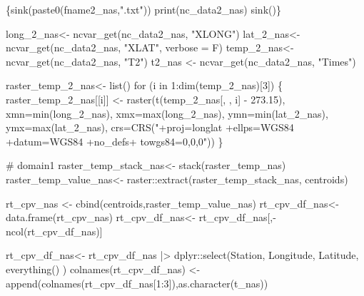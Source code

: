 \documentclass[
  letterpaper,
  DIV=11,
  numbers=noendperiod,
  abstract]{scrartcl}
\newenvironment{Shaded}{\begin{snugshade}}{\end{snugshade}}
\newcommand{\AttributeTok}[1]{\textcolor[rgb]{0.40,0.45,0.13}{#1}}
\newcommand{\CommentTok}[1]{\textcolor[rgb]{0.37,0.37,0.37}{#1}}
\newcommand{\ControlFlowTok}[1]{\textcolor[rgb]{0.00,0.23,0.31}{#1}}
\newcommand{\DecValTok}[1]{\textcolor[rgb]{0.68,0.00,0.00}{#1}}
\newcommand{\FloatTok}[1]{\textcolor[rgb]{0.68,0.00,0.00}{#1}}
\newcommand{\FunctionTok}[1]{\textcolor[rgb]{0.28,0.35,0.67}{#1}}
\newcommand{\NormalTok}[1]{\textcolor[rgb]{0.00,0.23,0.31}{#1}}
\newcommand{\OtherTok}[1]{\textcolor[rgb]{0.00,0.23,0.31}{#1}}
\newcommand{\SpecialCharTok}[1]{\textcolor[rgb]{0.37,0.37,0.37}{#1}}
\newcommand{\StringTok}[1]{\textcolor[rgb]{0.13,0.47,0.30}{#1}}
\begin{document}
\begin{Shaded}
\begin{Highlighting}[]
\NormalTok{\{}\FunctionTok{sink}\NormalTok{(}\FunctionTok{paste0}\NormalTok{(fname2\_nas,}\StringTok{".txt"}\NormalTok{))}
  \FunctionTok{print}\NormalTok{(nc\_data2\_nas)}
  \FunctionTok{sink}\NormalTok{()\}}

\NormalTok{long\_2\_nas}\OtherTok{\textless{}{-}} \FunctionTok{ncvar\_get}\NormalTok{(nc\_data2\_nas, }\StringTok{"XLONG"}\NormalTok{)}
\NormalTok{lat\_2\_nas}\OtherTok{\textless{}{-}} \FunctionTok{ncvar\_get}\NormalTok{(nc\_data2\_nas, }\StringTok{"XLAT"}\NormalTok{, }\AttributeTok{verbose =}\NormalTok{ F)}
\NormalTok{temp\_2\_nas}\OtherTok{\textless{}{-}} \FunctionTok{ncvar\_get}\NormalTok{(nc\_data2\_nas, }\StringTok{"T2"}\NormalTok{) }
\NormalTok{t2\_nas }\OtherTok{\textless{}{-}} \FunctionTok{ncvar\_get}\NormalTok{(nc\_data2\_nas, }\StringTok{"Times"}\NormalTok{)}

\NormalTok{raster\_temp\_2\_nas}\OtherTok{\textless{}{-}} \FunctionTok{list}\NormalTok{()}
\ControlFlowTok{for}\NormalTok{ (i }\ControlFlowTok{in} \DecValTok{1}\SpecialCharTok{:}\FunctionTok{dim}\NormalTok{(temp\_2\_nas)[}\DecValTok{3}\NormalTok{])   \{}
\NormalTok{    raster\_temp\_2\_nas[[i]] }\OtherTok{\textless{}{-}} \FunctionTok{raster}\NormalTok{(}\FunctionTok{t}\NormalTok{(temp\_2\_nas[, , i] }\SpecialCharTok{{-}} \FloatTok{273.15}\NormalTok{), }
       \AttributeTok{xmn=}\FunctionTok{min}\NormalTok{(long\_2\_nas), }\AttributeTok{xmx=}\FunctionTok{max}\NormalTok{(long\_2\_nas),}
       \AttributeTok{ymn=}\FunctionTok{min}\NormalTok{(lat\_2\_nas), }\AttributeTok{ymx=}\FunctionTok{max}\NormalTok{(lat\_2\_nas), }
       \AttributeTok{crs=}\FunctionTok{CRS}\NormalTok{(}\StringTok{"+proj=longlat +ellps=WGS84 +datum=WGS84 +no\_defs+ towgs84=0,0,0"}\NormalTok{))}
\NormalTok{\}}

\CommentTok{\# domain1}
\NormalTok{raster\_temp\_stack\_nas}\OtherTok{\textless{}{-}} \FunctionTok{stack}\NormalTok{(raster\_temp\_nas)}
\NormalTok{raster\_temp\_value\_nas}\OtherTok{\textless{}{-}}\NormalTok{ raster}\SpecialCharTok{::}\FunctionTok{extract}\NormalTok{(raster\_temp\_stack\_nas, centroids)}

\NormalTok{rt\_cpv\_nas }\OtherTok{\textless{}{-}} \FunctionTok{cbind}\NormalTok{(centroids,raster\_temp\_value\_nas)}
\NormalTok{rt\_cpv\_df\_nas}\OtherTok{\textless{}{-}} \FunctionTok{data.frame}\NormalTok{(rt\_cpv\_nas)}
\NormalTok{rt\_cpv\_df\_nas}\OtherTok{\textless{}{-}}\NormalTok{ rt\_cpv\_df\_nas[,}\SpecialCharTok{{-}}\FunctionTok{ncol}\NormalTok{(rt\_cpv\_df\_nas)]}

\NormalTok{rt\_cpv\_df\_nas}\OtherTok{\textless{}{-}} 
\NormalTok{  rt\_cpv\_df\_nas }\SpecialCharTok{|\textgreater{}} 
\NormalTok{  dplyr}\SpecialCharTok{::}\FunctionTok{select}\NormalTok{(Station, Longitude, Latitude,  }\FunctionTok{everything}\NormalTok{() )}
\FunctionTok{colnames}\NormalTok{(rt\_cpv\_df\_nas) }\OtherTok{\textless{}{-}} \FunctionTok{append}\NormalTok{(}\FunctionTok{colnames}\NormalTok{(rt\_cpv\_df\_nas[}\DecValTok{1}\SpecialCharTok{:}\DecValTok{3}\NormalTok{]),}\FunctionTok{as.character}\NormalTok{(t\_nas))}


\end{Highlighting}
\end{Shaded}
\end{document}

